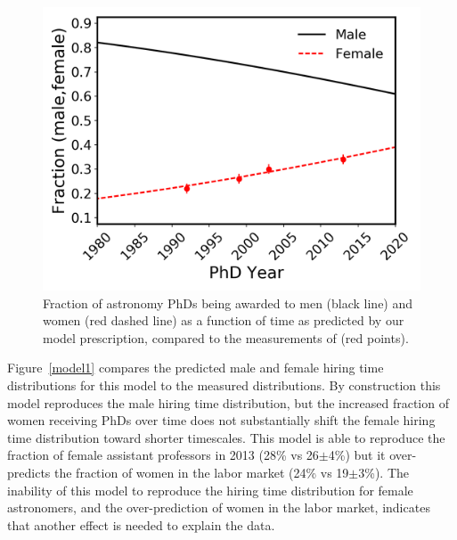 \documentclass[modern]{aastex62}
\begin{document}
\begin{figure}[!hbt]
\center
\includegraphics[scale=.6]{f_phd.png}
\caption{Fraction of astronomy PhDs being awarded to men (black line) and women (red dashed line) as a function of time as predicted by our model prescription, compared to the measurements of \citet{hug14} (red points).\label{f_phd}}
\end{figure}

Figure~\ref{model1} compares the predicted male and female hiring time distributions for this model to the measured distributions. By construction this model reproduces the male hiring time distribution, but the increased fraction of women receiving PhDs over time does not substantially shift the female hiring time distribution toward shorter timescales. This model is able to reproduce the fraction of female assistant professors in 2013 (28\% vs 26$\pm$4\%) but it over-predicts the fraction of women in the labor market (24\% vs 19$\pm$3\%). The inability of this model to reproduce the hiring time distribution for female astronomers, and the over-prediction of women in the labor market, indicates that another effect is needed to explain the data. 
\end{document}
